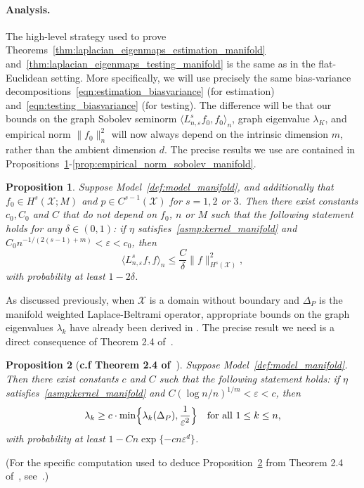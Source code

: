 \documentclass{article}
\newcommand{\1}{\mathbf{1}}
\newcommand{\mc}[1]{\mathcal{#1}}
\newcommand{\dotp}[2]{\langle #1, #2 \rangle}
\theoremstyle{alden}
\theoremstyle{aldenthm}
\newtheorem{proposition}{Proposition}
\theoremstyle{definition}
\theoremstyle{remark}
\begin{document}

\paragraph{Analysis.}
The high-level strategy used to prove Theorems~\ref{thm:laplacian_eigenmaps_estimation_manifold} and~\ref{thm:laplacian_eigenmaps_testing_manifold} is the same as in the flat-Euclidean setting. More specifically, we will use precisely the same bias-variance decompositions~\eqref{eqn:estimation_biasvariance} (for estimation) and~\eqref{eqn:testing_biasvariance} (for testing). The difference will be that our bounds on the graph Sobolev seminorm $\dotp{L_{n,\varepsilon}^sf_0}{f_0}_n$, graph eigenvalue $\lambda_K$, and empirical norm $\|f_0\|_n^2$ will now always depend on the intrinsic dimension $m$, rather than the ambient dimension $d$. The precise results we use are contained in Propositions~\ref{prop:graph_seminorm_manifold}-\ref{prop:empirical_norm_sobolev_manifold}.
\begin{proposition}
	\label{prop:graph_seminorm_manifold} 
	Suppose Model~\ref{def:model_manifold}, and additionally that $f_0 \in H^s(\mc{X};M)$ and $p \in C^{s - 1}(\mc{X})$ for $s = 1,2$ or $3$. Then there exist constants $c_0,C_0$ and $C$ that do not depend on $f_0$, $n$ or $M$ such that the following statement holds for any $\delta \in (0,1)$: if $\eta$ satisfies~\ref{asmp:kernel_manifold} and $C_0n^{-1/(2(s - 1) + m)} < \varepsilon < c_0$, then
	\begin{equation}
	\label{eqn:graph_seminorm_manifold}
	\dotp{L_{n,\varepsilon}^s f}{f}_n \leq \frac{C}{\delta} \|f\|_{H^s(\mc{X})}^2,
	\end{equation}
	with probability at least $1 - 2\delta$.
\end{proposition}

As discussed previously, when $\mc{X}$ is a domain without boundary and $\Delta_P$ is the manifold weighted Laplace-Beltrami operator, appropriate bounds on the graph eigenvalues $\lambda_k$ have already been derived in \citep{burago2014,trillos2019,garciatrillos19}. The precise result we need is a direct consequence of Theorem 2.4 of~\citep{calder2019}.
\begin{proposition}[\textbf{c.f Theorem 2.4 of~\citep{calder2019}}]
	\label{prop:graph_eigenvalue_manifold}
	Suppose Model~\ref{def:model_manifold}. Then there exist constants $c$ and $C$ such that the following statement holds: if $\eta$ satisfies~\ref{asmp:kernel_manifold} and $C(\log n/n)^{1/m} < \varepsilon < c$, then
	\begin{equation}
	\label{eqn:graph_eigenvalue_manifold}
	\lambda_k \geq c \cdot \min\Bigl\{\lambda_k(\Delta_P), \frac{1}{\varepsilon^{2}} \Bigr\} \quad \textrm{for all $1 \leq k \leq n$,}
	\end{equation}
	with probability at least $1 - Cn\exp\{-c n\varepsilon^d\}$. 
\end{proposition}
(For the specific computation used to deduce Proposition~\ref{prop:graph_eigenvalue_manifold} from Theorem 2.4 of~\citep{calder2019}, see~\cite{green2021}.)
\end{document}

